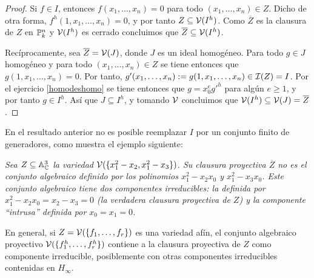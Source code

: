 \documentclass[ACGA.tex]{subfiles}
\begin{document}
\begin{proof}
 Si $f\in I$, entonces $f(x_1,\ldots,x_n)=0$ para todo $(x_1,\ldots,x_n)\in Z$. Dicho de otra forma, $f^h(1,x_1,\ldots,x_n)=0$, y por tanto $Z\subseteq\mathcal{V}(I^h)$. Como $\overline Z$ es la clausura de $Z$ en $\mathbb{P}^n_k$ y $\mathcal{V}(I^h)$ es cerrado concluimos que $\overline Z\subseteq\mathcal{V}(I^h)$. 

Recíprocamente, sea $\overline Z=\mathcal{V}(J)$, donde $J$ es un ideal homogéneo. Para todo $g\in J$ homogéneo y para todo $(x_1,\ldots,x_n)\in Z$ se tiene entonces que $g(1,x_1,\ldots,x_n)=0$. Por tanto, $g'(x_1,\ldots,x_n):=g(1,x_1,\ldots,x_n)\in\mathcal{I}(Z)=I$. Por el ejercicio \ref{homodeshomo} se tiene entonces que $g=x_0^eg'^h$ para algún $e\geq 1$, y por tanto $g\in I^h$. Así que $J\subseteq I^h$, y tomando $\mathcal{V}$ concluimos que $\mathcal{V}(I^h)\subseteq\mathcal{V}(J)=\overline Z$.
\end{proof}

En el resultado anterior no es posible reemplazar $I$ por un conjunto finito de generadores, como muestra el ejemplo siguiente:

\begin{ejs}
 \emph{Sea $Z\subseteq\mathbb{A}^3_{\mathbb{C}}$ la variedad $\mathcal{V}(\{x_1^2-x_2,x_1^2-x_3\})$. Su clausura proyectiva $\overline Z$ {\it no es} el conjunto algebraico definido por los polinomios $x_1^2-x_2x_0$ y $x_1^2-x_3x_0$. Este conjunto algebraico tiene dos componentes irreducibles: la definida por $x_1^2-x_2x_0=x_2-x_3=0$ (la verdadera clausura proyectiva de $Z$) y la componente ``intrusa'' definida por $x_0=x_1=0$.}
\end{ejs}

En general, si $Z=\mathcal{V}(\{f_1,\ldots,f_r\})$ es una variedad afín, el conjunto algebraico proyectivo $\mathcal{V}(\{f_1^h,\ldots,f_r^h\})$ contiene a la clausura proyectiva de $Z$ como componente irreducible, posiblemente con otras componentes irreducibles contenidas en $H_\infty$.
\end{document}
